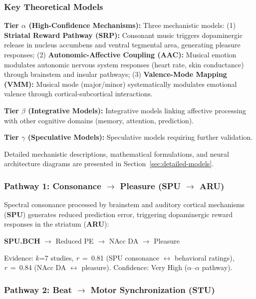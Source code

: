 \documentclass[9pt,onecolumn]{article}
\newcommand{\STU}{\textcolor{stucolor}{\textbf{STU}}}
\newcommand{\SPU}{\textcolor{spucolor}{\textbf{SPU}}}
\newcommand{\ARU}{\textcolor{arucolor}{\textbf{ARU}}}
\newcommand{\correlation}[1]{\textit{r}~=~#1}
\begin{document}
\subsubsection{Key Theoretical Models}

\textbf{Tier $\alpha$ (High-Confidence Mechanisms):} Three mechanistic models: (1) \textbf{Striatal Reward Pathway (SRP):} Consonant music triggers dopaminergic release in nucleus accumbens and ventral tegmental area, generating pleasure responses; (2) \textbf{Autonomic-Affective Coupling (AAC):} Musical emotion modulates autonomic nervous system responses (heart rate, skin conductance) through brainstem and insular pathways; (3) \textbf{Valence-Mode Mapping (VMM):} Musical mode (major/minor) systematically modulates emotional valence through cortical-subcortical interactions.

\textbf{Tier $\beta$ (Integrative Models):} Integrative models linking affective processing with other cognitive domains (memory, attention, prediction).

\textbf{Tier $\gamma$ (Speculative Models):} Speculative models requiring further validation.

Detailed mechanistic descriptions, mathematical formulations, and neural architecture diagrams are presented in Section~\ref{sec:detailed-models}.

\subsubsection{Pathway 1: Consonance $\rightarrow$ Pleasure (\SPU{} $\rightarrow$ \ARU{})}

Spectral consonance processed by brainstem and auditory cortical mechanisms (\SPU{}) generates reduced prediction error, triggering dopaminergic reward responses in the striatum (\ARU{}):

\begin{center}
\small
\textbf{SPU.BCH} $\rightarrow$ Reduced PE $\rightarrow$ NAcc DA $\rightarrow$ Pleasure
\end{center}

Evidence: $k$=7 studies, \correlation{0.81} (SPU consonance $\leftrightarrow$ behavioral ratings),  \correlation{0.84} (NAcc DA $\leftrightarrow$ pleasure). Confidence: Very High ($\alpha$--$\alpha$ pathway).

\subsubsection{Pathway 2: Beat $\rightarrow$ Motor Synchronization (\STU{})}
\end{document}
